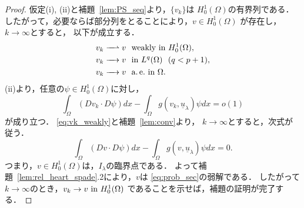 \begin{proof}
 仮定(i), (ii)と補題~\ref{lem:PS_seq}より，$\{v_k \}$は
 $H_0^1(\Omega)$の有界列である．
 したがって，必要ならば部分列をとることにより，$v \in H_0^1(\Omega)$
 が存在し，$k \to \infty$とすると，
 以下が成立する．
 \begin{align}
  v_k \xrightharpoonup{ \mbox{ ~ } } v & \ \ \text{weakly~} \tin
  H_0^1(\Omega), \label{eq:vk_weakly} \\
  v_k \xrightarrow{ \mbox{ ~ } } v & \ \ \tin L^q(\Omega) \ \
   (q < p+1), \label{eq:vk_Lq} \\
  v_k \xrightarrow{ \mbox{ ~ } } v & \ \ \ae \tin \Omega. 
    \label{eq:vk_ae}
 \end{align}
 (ii)より，任意の$\psi \in H_0^1(\Omega)$に対し，
 \[
 \int_\Omega (Dv_k \cdot D\psi) dx - \int_\Omega g(v_k,
 \underline{u}_\lambda) \psi dx = o(1)
 \]
 が成り立つ．
 \eqref{eq:vk_weakly}と補題~\ref{lem:conv}より，
 $k \to \infty$とすると，次式が従う．
 \begin{equation}
  \int_\Omega (Dv \cdot D\psi) dx - \int_\Omega g(v,
   \underline{u}_\lambda) \psi dx = 0. \label{eq:intvpsi}
 \end{equation}
 つまり，$v \in H_0^1(\Omega)$は，$I_\lambda$の臨界点である．
 よって補題~\ref{lem:rel_heart_spade}.2により，$v$は
 \ref{eq:prob_sec}の弱解である．
 したがって$k \to \infty$のとき，$v_k \to v ~\text{in}~ H_0^1(\Omega)$
 であることを示せば，補題の証明が完了する．


\end{proof}
